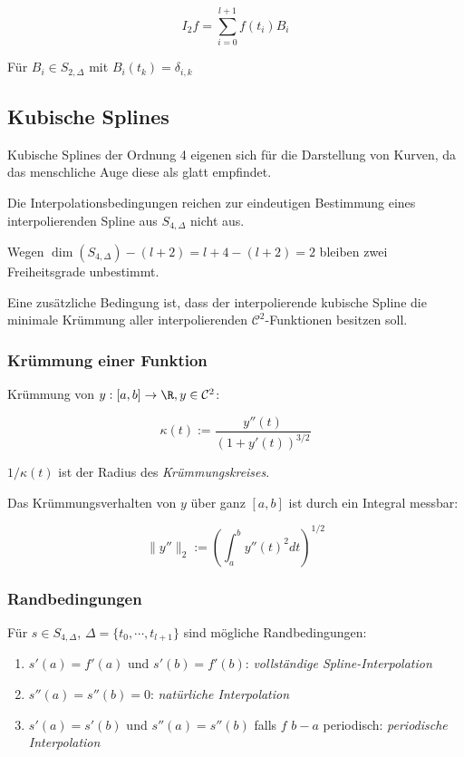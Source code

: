 $$I_2 f = \sum_{i=0}^{l+1} f(t_i) B_i$$

Für $B_i \in S_{2,\Delta}$ mit $B_i(t_k) = \delta_{i,k}$

\subsection*{Kubische Splines}

Kubische Splines der Ordnung 4 eigenen sich für die Darstellung von Kurven, da das menschliche Auge diese als glatt empfindet.

\vspace{2mm}

Die Interpolationsbedingungen reichen zur eindeutigen Bestimmung eines interpolierenden Spline aus $S_{4,\Delta}$ nicht aus.

Wegen $\dim(S_{4,\Delta}) - (l+2) = l+4-(l+2) = 2$ bleiben zwei Freiheitsgrade unbestimmt.

Eine zusätzliche Bedingung ist, dass der interpolierende kubische Spline die minimale Krümmung aller interpolierenden $\mathcal{C}^2$-Funktionen besitzen soll.

\subsubsection*{Krümmung einer Funktion}

Krümmung von $y : [a,b] \rightarrow \R, y \in \mathcal{C}^2$:

$$\kappa(t) := \frac{y''(t)}{(1+y'(t))^{3/2}}$$

$1/\kappa(t)$ ist der Radius des \emph{Krümmungskreises}.

Das Krümmungsverhalten von $y$ über ganz $[a,b]$ ist durch ein Integral messbar:

$$\|y''\|_2 := \left(\int_a^b y''(t)^2 dt\right)^{1/2}$$

\subsubsection*{Randbedingungen}

Für $s \in S_{4,\Delta}$, $\Delta = \{t_0,\cdots,t_{l+1}\}$ sind mögliche Randbedingungen:

\begin{enumerate}[label=(\alph*)]
	\item $s'(a) = f'(a)$ und $s'(b)=f'(b)$: \emph{vollständige Spline-Interpolation}
	\item $s''(a) = s''(b) = 0$: \emph{natürliche Interpolation}
	\item $s'(a) = s'(b)$ und $s''(a) = s''(b)$ falls $f$ $b-a$ periodisch: \emph{periodische Interpolation}
\end{enumerate}

